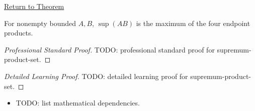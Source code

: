 \newpage
{}
\label{prf:supremum-product-set}

\begin{remark*}[Return]
\hyperref[thm:supremum-product-set]{Return to Theorem}
\end{remark*}

\begin{theorem*}
For nonempty bounded $A,B$, $\sup(AB)$ is the maximum of the four endpoint
products.
\end{theorem*}

\begin{proof}[Professional Standard Proof]
\LRAProofBodyStart
TODO: professional standard proof for supremum-product-set.
\end{proof}

\begin{proof}[Detailed Learning Proof]
\LRAProofBodyStart
TODO: detailed learning proof for supremum-product-set.
\end{proof}

\begin{remark*}
\end{remark*}

\begin{dependencies}
\begin{itemize}
  \item TODO: list mathematical dependencies.
\end{itemize}
\end{dependencies}

\clearpage
